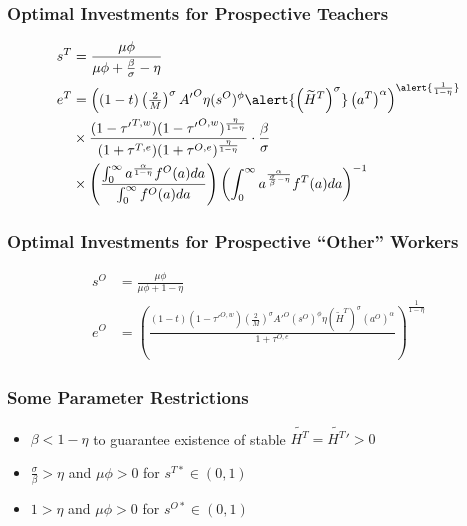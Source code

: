 \documentclass[11pt]{beamer}
\begin{document}
\begin{frame}
\frametitle{Optimal Investments for Prospective Teachers} 
\begin{align}
s^{T} & = \frac{\mu \phi}{\mu \phi+\frac{\beta}{\sigma}-\eta} \nonumber\\
e^{T} & = \left( (1-t) \left(\tfrac{2}{M}\right)^\sigma {A'}^O \eta (s^{O})^\phi \alert{\left(\widetilde{H}^T\right)^\sigma} \left(a^{T}\right)^\alpha\right)^{\alert{\frac{1}{1-\eta}}} \nonumber\\
& \times \frac{(1-{\tau'}^{T,w})(1-{\tau'}^{O,w})^\frac{\eta}{1-\eta}}{(1+{\tau}^{T,e})(1+{\tau}^{O,e})^\frac{\eta}{1-\eta}} \cdot \frac{\beta}{\sigma} \nonumber\\
& \times \left( \frac{\int_0^\infty a^\frac{\alpha}{1-\eta} f^O(a) da}{\int_0^\infty f^O(a) da}\right) \left( \int_0^\infty a^\frac{\alpha}{\frac{\sigma}{\beta}-\eta} f^T(a) da \right)^{-1} \nonumber
\end{align}

\end{frame}

\begin{frame}
\frametitle{Optimal Investments for Prospective ``Other'' Workers} 
\begin{align}
s^{O} & = \frac{\mu \phi}{\mu \phi+1-\eta} \nonumber \\
e^{O} & = \left( \frac{(1-t)(1-{\tau'}^{O,w})\left(\tfrac{2}{M}\right)^\sigma {A'}^O (s^{O})^\phi \eta \left(\widetilde{H}^T\right)^\sigma \left(a^{O}\right)^\alpha}{1+\tau^{O,e}} \right)^\frac{1}{1-\eta} \nonumber
\end{align}
\end{frame}

\begin{frame}
\frametitle{Some Parameter Restrictions}
\begin{itemize}
  \item $\beta < 1-\eta$ to guarantee existence of stable $\widetilde{H^T} = \widetilde{H^T}' > 0$
  \item $\tfrac{\sigma}{\beta} > \eta$ and $\mu \phi > 0$ for $s^{T*} \in (0,1)$
  \item $1 > \eta$ and $\mu \phi > 0$ for $s^{O*} \in (0,1)$
\end{itemize}
\end{frame}
\end{document}
